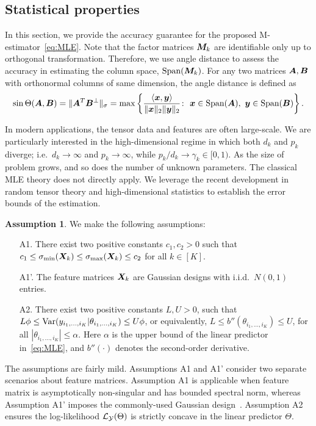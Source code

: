 \documentclass[12pt]{article}
\theoremstyle{definition}
\theoremstyle{definition}
\newtheorem{assumption}{Assumption}
\begin{document}
\subsection{Statistical properties}\label{subsec:statprob}
In this section, we provide the accuracy guarantee for the proposed M-estimator~\eqref{eq:MLE}. Note that the factor matrices $\bm M_k$ are identifiable only up to orthogonal transformation. Therefore, we use angle distance to assess the accuracy in estimating the column space, $\textup{Span}(\bm M_k)$. For any two matrices $\bm A,\bm B$ with orthonormal columns of same dimension, the angle distance is defined as
\[
\sin \Theta(\bm A,\bm B)=\lVert\bm A^T \bm B^{\perp}\rVert_\sigma=\max\left\{ \frac{\langle \bm x, \bm{y}\rangle}{\lVert\bm x\rVert_2\lVert\bm{y}\rVert_2}\colon \ \bm x\in \textup{Span}(\bm A),\ \bm{y}\in \textup{Span}(\bm B)\right\}.
\]

In modern applications, the tensor data and features are often large-scale. We are particularly interested in the high-dimensional regime in which both $d_k$ and $p_k$ diverge; i.e.\ $d_k\to \infty$ and $p_k\to\infty$, while $p_k/d_k \to \gamma_k \in[0,1)$. As the size of problem grows, and so does the number of unknown parameters. The classical MLE theory does not directly apply. We leverage the recent development in random tensor theory and high-dimensional statistics to establish the error bounds of the estimation. 

 
\begin{assumption}\label{ass}We make the following assumptions:
\begin{enumerate}[noitemsep,topsep=0pt]
\item [A1.] There exist two positive constants $c_1, c_2>0$ such that $c_1\leq \sigma_{\min}(\bm X_k)\leq  \sigma_{\max}(\bm X_k)\leq c_2$ for all $k\in[K]$. 
\item [A1'.] The feature matrices $\bm X_k$ are Gaussian designs with i.i.d.\ $N(0,1)$ entries.
\item [A2.] There exist two positive constants $L, U>0$, such that $L\phi \leq \textup{Var}(y_{i_1,\ldots,i_K}|\theta_{i_1,\ldots,i_K})\leq U\phi $, or equivalently, $L\leq b''(\theta_{i_1,\ldots,i_K}) \leq U$, for all $|\theta_{i_1,\ldots,i_K}|\leq \alpha$. Here $\alpha$ is the upper bound of the linear predictor in~\eqref{eq:MLE}, and $b''(\cdot)$ denotes the second-order derivative. 

\end{enumerate}
\end{assumption}
The assumptions are fairly mild. Assumptions A1 and A1' consider two separate scenarios about feature matrices. Assumption A1 is applicable when feature matrix is asymptotically non-singular and has bounded spectral norm, whereas Assumption A1' imposes the commonly-used Gaussian design~\citep{raskutti2019convex}. Assumption A2 ensures the log-likelihood $\mathcal{L}_{\mathcal{Y}}(\Theta)$ is strictly concave in the linear predictor $\Theta$. 
\end{document}
